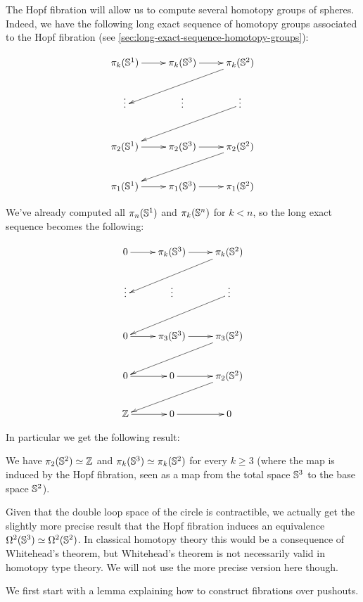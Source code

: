 The Hopf fibration will allow us to compute several homotopy groups of
spheres. Indeed, we have the following long exact sequence of homotopy groups
associated to the Hopf fibration (see
\autoref{sec:long-exact-sequence-homotopy-groups}):

\[
\xymatrix{
  \pi_k(\Sn^1) \ar[r] & \pi_k(\Sn^3) \ar[r] & \pi_k(\Sn^2) \ar[lld] \\
  \vdots & \vdots & \vdots \ar[lld] \\
  \pi_2(\Sn^1) \ar[r] & \pi_2(\Sn^3) \ar[r] & \pi_2(\Sn^2) \ar[lld] \\
  \pi_1(\Sn^1) \ar[r] & \pi_1(\Sn^3) \ar[r] & \pi_1(\Sn^2)}
\]

We’ve already computed all $\pi_n(\mathbb{S}^1)$ and $\pi_k(\mathbb{S}^n)$ for $k<n$, so the
long exact sequence becomes the following:

\[
\xymatrix{
  0 \ar[r] & \pi_k(\Sn^3) \ar[r] & \pi_k(\Sn^2) \ar[lld] \\
  \vdots & \vdots & \vdots \ar[lld] \\
  0 \ar[r] & \pi_3(\Sn^3) \ar[r] & \pi_3(\Sn^2) \ar[lld] \\
  0 \ar[r] & 0 \ar[r] & \pi_2(\Sn^2) \ar[lld] \\
  \Z \ar[r] & 0 \ar[r] & 0}
\]

In particular we get the following result:

\begin{cor} \label{cor:pis2-hopf}
  We have $\pi_2(\mathbb{S}^2) \simeq \mathbb{Z}$ and $\pi_k(\mathbb{S}^3) \simeq \pi_k(\mathbb{S}^2)$ for
  every $k\ge3$ (where the map is induced by the Hopf fibration, seen as a map
  from the total space $\mathbb{S}^3$ to the base space $\mathbb{S}^2$).
\end{cor}

Given that the double loop space of the circle is contractible, we actually get
the slightly more precise result that the Hopf fibration induces an equivalence
$\Omega^2(\mathbb{S}^3) \simeq \Omega^2(\mathbb{S}^2)$. In classical homotopy theory this
would be a consequence of Whitehead’s theorem, but Whitehead’s theorem is not
necessarily valid in homotopy type theory. We will not use the more precise
version here though.

We first start with a lemma explaining how to construct fibrations over
pushouts.

